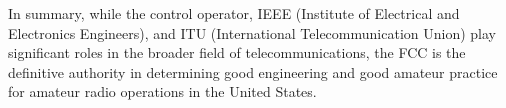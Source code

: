 In summary, while the control operator, IEEE (Institute of Electrical and Electronics Engineers), and ITU (International Telecommunication Union) play significant roles in the broader field of telecommunications, the FCC is the definitive authority in determining good engineering and good amateur practice for amateur radio operations in the United States.

